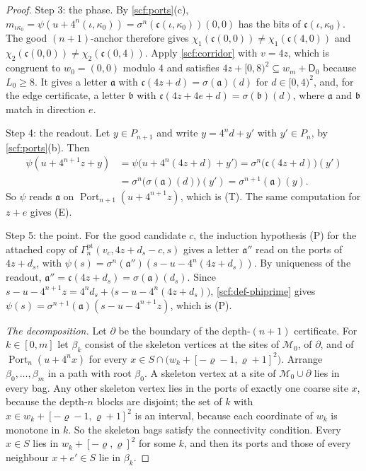 \begin{proof}
Step 3: the phase. By \cref{scf:ports}(c), $m_{\iota\kappa_0}=\psi(u+4^n(\iota,\kappa_0))=\sigma^n(\mathfrak c(\iota,\kappa_0))(0,0)$ has the bits of $\mathfrak c(\iota,\kappa_0)$. The good $(n+1)$-anchor therefore gives $\chi_1(\mathfrak c(0,0))\ne\chi_1(\mathfrak c(4,0))$ and $\chi_2(\mathfrak c(0,0))\ne\chi_2(\mathfrak c(0,4))$. Apply \cref{scf:corridor} with $v=4z$, which is congruent to $w_0=(0,0)$ modulo $4$ and satisfies $4z+[0,8)^2\subseteq w_m+\mathsf D_0$ because $L_0\ge8$. It gives a letter $\mathfrak a$ with $\mathfrak c(4z+d)=\sigma(\mathfrak a)(d)$ for $d\in[0,4)^2$, and, for the edge certificate, a letter $\mathfrak b$ with $\mathfrak c(4z+4e+d)=\sigma(\mathfrak b)(d)$, where $\mathfrak a$ and $\mathfrak b$ match in direction $e$.

Step 4: the readout. Let $y\in P_{n+1}$ and write $y=4^nd+y'$ with $y'\in P_n$, by \cref{scf:ports}(b). Then
\[
\begin{aligned}
\psi(u+4^{n+1}z+y)&=\psi\bigl(u+4^n(4z+d)+y'\bigr)=\sigma^n\bigl(\mathfrak c(4z+d)\bigr)(y')\\
&=\sigma^n\bigl(\sigma(\mathfrak a)(d)\bigr)(y')=\sigma^{n+1}(\mathfrak a)(y).
\end{aligned}
\]
So $\psi$ reads $\mathfrak a$ on $\operatorname{Port}_{n+1}(u+4^{n+1}z)$, which is (T). The same computation for $z+e$ gives (E).

Step 5: the point. For the good candidate $c$, the induction hypothesis (P) for the attached copy of $\Gamma^{\mathrm{pt}}_n(v_c,4z+d_s-c,s)$ gives a letter $\mathfrak a''$ read on the ports of $4z+d_s$, with $\psi(s)=\sigma^n(\mathfrak a'')(s-u-4^n(4z+d_s))$. By uniqueness of the readout, $\mathfrak a''=\mathfrak c(4z+d_s)=\sigma(\mathfrak a)(d_s)$. Since $s-u-4^{n+1}z=4^nd_s+\bigl(s-u-4^n(4z+d_s)\bigr)$, \cref{scf:def-phiprime} gives $\psi(s)=\sigma^{n+1}(\mathfrak a)(s-u-4^{n+1}z)$, which is (P).

\emph{The decomposition.} Let $\partial$ be the boundary of the depth-$(n+1)$ certificate. For $k\in[0,m]$ let $\beta_k$ consist of the skeleton vertices at the sites of $\mathcal M_0$, of $\partial$, and of $\operatorname{Port}_n(u+4^nx)$ for every $x\in S\cap\bigl(w_k+[-\varrho-1,\varrho+1]^2\bigr)$. Arrange $\beta_0,\dots,\beta_m$ in a path with root $\beta_0$. A skeleton vertex at a site of $\mathcal M_0\cup\partial$ lies in every bag. Any other skeleton vertex lies in the ports of exactly one coarse site $x$, because the depth-$n$ blocks are disjoint; the set of $k$ with $x\in w_k+[-\varrho-1,\varrho+1]^2$ is an interval, because each coordinate of $w_k$ is monotone in $k$. So the skeleton bags satisfy the connectivity condition. Every $x\in S$ lies in $w_k+[-\varrho,\varrho]^2$ for some $k$, and then its ports and those of every neighbour $x+e'\in S$ lie in $\beta_k$.


\end{proof}
